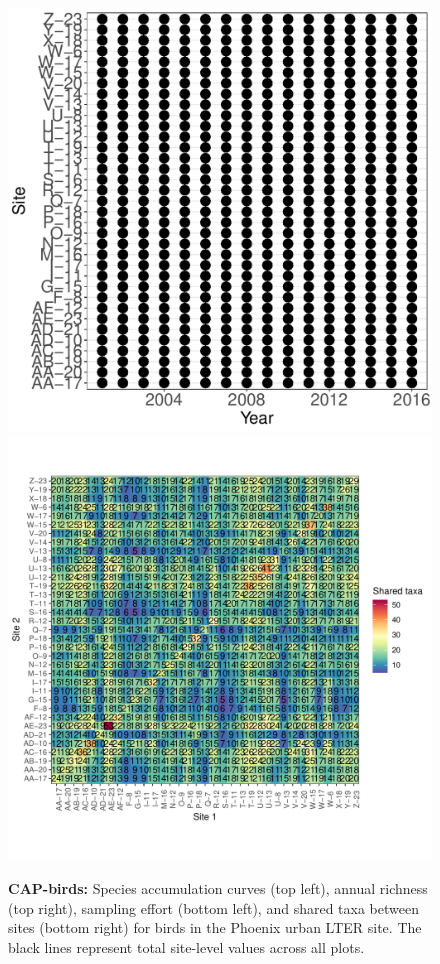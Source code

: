 \documentclass[11pt, oneside]{article}
\begin{document}
\begin{figure}[h!]
\includegraphics[scale = 0.4]{cap-birds-banville_spatiotemporal_sampling_effort.pdf}
\includegraphics[scale = 0.4]{cap-birds-banville_spp_shared.pdf}
\caption{{\bf CAP-birds:} Species accumulation curves (top left),  annual richness (top right), sampling effort (bottom left), and shared taxa between sites (bottom right) for birds in the Phoenix urban LTER site. The black lines represent total site-level values across all plots.}
\label{cap-birds}
\end{figure}
\end{document}
